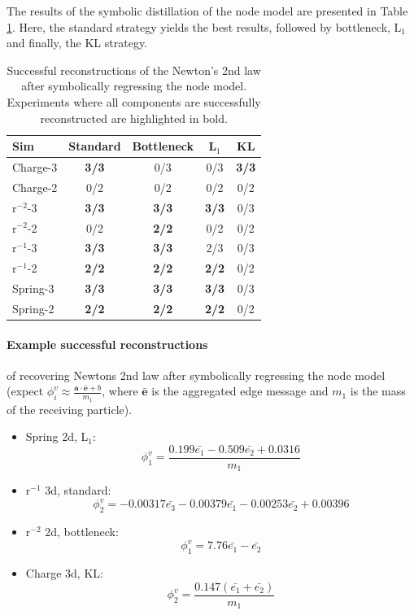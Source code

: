 \documentclass[11pt]{article}
\begin{document}
    The results of the symbolic distillation of the node model are presented in Table \ref{tab:sr_edge_model_table}. Here, the standard strategy yields the best results, followed by bottleneck, L$_1$  and finally, the KL strategy.
    \begin{table}[H]
        \centering
        \begin{tabular}{lcccc}
        \hline
        Sim & Standard & Bottleneck & L$_1$ & KL \\
        \hline
        Charge-3 & \textbf{3/3} & 0/3 & 0/3 & \textbf{3/3} \\
        Charge-2 & 0/2 & 0/2 & 0/2 & 0/2 \\
        r$^{-2}$-3 & \textbf{3/3} & \textbf{3/3} & \textbf{3/3} & 0/3 \\
        r$^{-2}$-2 & 0/2 & \textbf{2/2} & 0/2 & 0/2 \\
        r$^{-1}$-3 & \textbf{3/3} & \textbf{3/3} & 2/3 & 0/3 \\
        r$^{-1}$-2 & \textbf{2/2} & \textbf{2/2} & \textbf{2/2} & 0/2 \\
        Spring-3 & \textbf{3/3} & \textbf{3/3} & \textbf{3/3}  & 0/3 \\
        Spring-2 & \textbf{2/2} & \textbf{2/2} & \textbf{2/2} & 0/2 \\
        \hline
        \end{tabular}
        \caption{Successful reconstructions of the Newton's 2nd law after symbolically regressing the node model. Experiments where all components are successfully reconstructed are highlighted in bold.}
        \label{tab:sr_edge_model_table}
    \end{table}


\paragraph*{Example successful reconstructions} of recovering Newtons 2nd law after symbolically regressing the node model (expect $\phi^{v}_i \approx \frac{\mathbf{a} \cdot \mathbf{\bar{e}} + b}{m_1}$, where $\mathbf{\bar{e}}$ is the aggregated edge message and $m_1$ is the mass of the receiving particle).
\begin{itemize}
        \item
        Spring 2d, L$_1$:
        $$
        \phi^{v}_1 = \frac{0.199\bar{e_1} - 0.509\bar{e_2} + 0.0316}{m_1}$$
        \item
        r$^{-1}$ 3d, standard:
        $$
        \phi^{v}_2 = -0.00317\bar{e_3} - 0.00379\bar{e_1} - 0.00253\bar{e_2} + 0.00396
        $$
        \item
        r$^{-2}$ 2d, bottleneck:
        $$
        \phi^{v}_1 = 7.76\bar{e_1} - \bar{e_2}
        $$
        \item
        Charge 3d, KL:
        $$
        \phi^{v}_2 = \frac{0.147(\bar{e_1} + \bar{e_2})}{m_1}
        $$
    \end{itemize}
\end{document}
